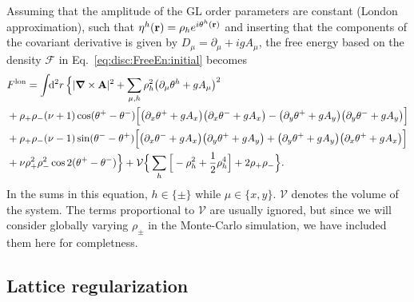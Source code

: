 Assuming that the amplitude of the GL order parameters are constant (London approximation),
such that $\eta^h({\boldsymbol{\mathbf{r}}}) = \rho_he^{i\theta^h({\boldsymbol{\mathbf{r}}})}$ and inserting that the components of the
covariant derivative is given by $D_\mu = \partial_\mu + igA_\mu$, the free energy based on the density $\mathcal{F}$ in Eq.~\eqref{eq:disc:FreeEn:initial} becomes
\begin{equation}
  \begin{split}
	&F^\text{lon} = \int\!\!\mathrm{d}^2r\,\Big\{|{\boldsymbol{\mathbf{\nabla}}}\times{\ensuremath{\boldsymbol{\mathbf{A}}}}|^2 + \sum_{\mu,h}\rho_h^2\big(\partial_\mu\theta^h + gA_\mu\big)^2\\
	&+\rho_+\rho_-(\nu+1)\cos(\theta^+-\theta^-)\Big[\big(\partial_x\theta^+ + gA_x\big)\big(\partial_x\theta^- + gA_x\big) - \big(\partial_y\theta^+ + gA_y\big)\big(\partial_y\theta^- + gA_y\big)\Big]\\
	&+\rho_+\rho_-(\nu-1)\sin(\theta^--\theta^+)\Big[\big(\partial_x\theta^- + gA_x\big)\big(\partial_y\theta^+ + gA_y\big) + \big(\partial_y\theta^+ + gA_y\big)\big(\partial_x\theta^+ + gA_x\big)\Big]\\
  & + \nu\rho_+^2\rho_-^2\cos 2(\theta^+-\theta^-)\Big\} + \mathcal{V}\Big\{\sum_h\Big[-\rho_h^2 + \frac{1}{2}\rho_h^4\Big] + 2\rho_+\rho_-\Big\}.
  \end{split}
  \label{eq:disc:FreeEn:London}
\end{equation}
In the sums in this equation, $h\in\{\pm\}$ while $\mu\in\{x,y\}$. $\mathcal{V}$ denotes the volume of the system. The terms proportional to $\mathcal{V}$ are usually ignored, but since
we will consider globally varying $\rho_\pm$ in the Monte-Carlo simulation, we have included them here for completness.

\subsection{Lattice regularization}

